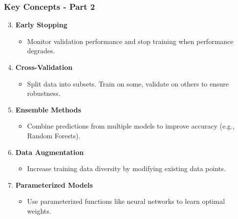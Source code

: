 \documentclass[aspectratio=169]{beamer}
\begin{document}
\begin{frame}[fragile]
    \frametitle{Key Concepts - Part 2}
    \begin{enumerate}
        \setcounter{enumi}{2}
        \item \textbf{Early Stopping}
        \begin{itemize}
            \item Monitor validation performance and stop training when performance degrades.
        \end{itemize}
        \item \textbf{Cross-Validation}
        \begin{itemize}
            \item Split data into subsets. Train on some, validate on others to ensure robustness.
        \end{itemize}
        \item \textbf{Ensemble Methods}
        \begin{itemize}
            \item Combine predictions from multiple models to improve accuracy (e.g., Random Forests).
        \end{itemize}
        \item \textbf{Data Augmentation}
        \begin{itemize}
            \item Increase training data diversity by modifying existing data points.
        \end{itemize}
        \item \textbf{Parameterized Models}
        \begin{itemize}
            \item Use parameterized functions like neural networks to learn optimal weights.
        \end{itemize}
    \end{enumerate}
\end{frame}
\end{document}
